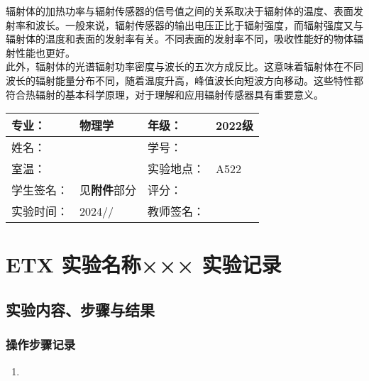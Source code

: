 \documentclass[dvipsnames, svgnames,a4paper,11pt]{article}
\begin{document}
辐射体的加热功率与辐射传感器的信号值之间的关系取决于辐射体的温度、表面发射率和波长。一般来说，辐射传感器的输出电压正比于辐射强度，而辐射强度又与辐射体的温度和表面的发射率有关。不同表面的发射率不同，吸收性能好的物体辐射性能也更好。\\

此外，辐射体的光谱辐射功率密度与波长的五次方成反比。这意味着辐射体在不同波长的辐射能量分布不同，随着温度升高，峰值波长向短波方向移动。这些特性都符合热辐射的基本科学原理，对于理解和应用辐射传感器具有重要意义。\\
	
	
	
	
	\clearpage
	
	\begin{table}
		\renewcommand\arraystretch{1.7}
		\centering
		\begin{tabularx}{\textwidth}{|X|X|X|X|}
			\hline
			专业： & 物理学 & 年级： & 2022级 \\
			\hline
			姓名： &  & 学号： & \\
			\hline
			室温： &  & 实验地点： & A522 \\
			\hline
			学生签名：& 见\textbf{附件}部分 & 评分： &\\
			\hline
			实验时间：& 2024// & 教师签名：&\\
			\hline
		\end{tabularx}
	\end{table}
	
	\section{ETX 实验名称×××  \quad\heiti 实验记录}
	
	\subsection{实验内容、步骤与结果}
	
	\subsubsection{操作步骤记录}
	\begin{enumerate}
		\item 
	\end{enumerate}	
	
\end{document}
